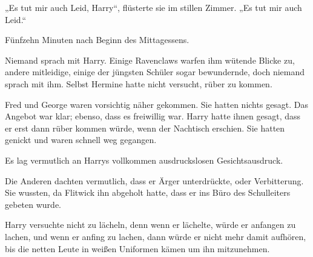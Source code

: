 „Es tut mir auch Leid, Harry“, flüsterte sie im stillen Zimmer. „Es tut mir auch Leid.“ 

\later 

Fünfzehn Minuten nach Beginn des Mittagessens. 

Niemand sprach mit Harry. Einige Ravenclaws warfen ihm wütende Blicke zu, andere mitleidige, einige der jüngsten Schüler sogar bewundernde, doch niemand sprach mit ihm. Selbst Hermine hatte nicht versucht, rüber zu kommen. 

Fred und George waren vorsichtig näher gekommen. Sie hatten nichts gesagt. Das Angebot war klar; ebenso, dass es freiwillig war. Harry hatte ihnen gesagt, dass er erst dann rüber kommen würde, wenn der Nachtisch erschien. Sie hatten genickt und waren schnell weg gegangen. 

Es lag vermutlich an Harrys vollkommen ausdruckslosen Gesichtsausdruck. 

Die Anderen dachten vermutlich, dass er Ärger unterdrückte, oder Verbitterung. Sie wussten, da Flitwick ihn abgeholt hatte, dass er ins Büro des Schulleiters gebeten wurde. 

Harry versuchte nicht zu lächeln, denn wenn er lächelte, würde er anfangen zu lachen, und wenn er anfing zu lachen, dann würde er nicht mehr damit aufhören, bis die netten Leute in weißen Uniformen kämen um ihn mitzunehmen. 

